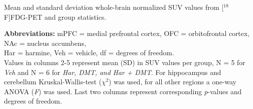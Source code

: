 \documentclass[tikz,crop,convert={density=400,outext=.png}]{standalone}
\begin{document}
\begin{table}
\begin{threeparttable}
\robustify\bfseries
\caption{Mean and standard deviation whole-brain normalized SUV values from [$^{18}$F]FDG-PET and group statistics.}

    \begin{tablenotes}
      \item\footnotesize{\textbf{Abbreviations:} mPFC = medial prefrontal cortex, OFC = orbitofrontal cortex, NAc = nucleus accumbens,  \\ Har = harmine, Veh =  vehicle, df = degrees of freedom.  \\
Values in columns 2-5 represent mean (SD) in SUV values per group, N = 5 for \textit{Veh} and N = 6 for \textit{Har, DMT, and Har + DMT}.  For hippocampus and cerebellum Kruskal-Wallis-test (\textit{$\chi^{2}$}) was used, for all other regions a one-way ANOVA (\textit{F}) was used. Last two columns represent corresponding \textit{p}-values and degrees of freedom. }
    \end{tablenotes}
  \end{threeparttable}
\end{table}
\end{document}
